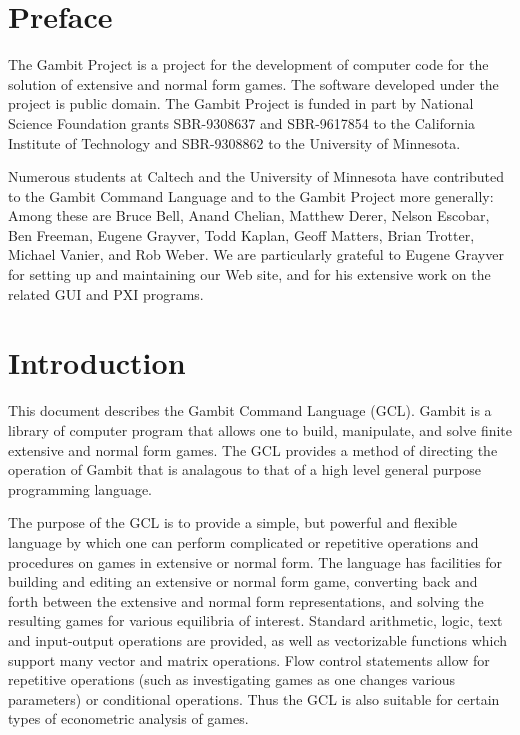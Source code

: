 \tableofcontents

\chapter*{Preface}
\pagestyle{myheadings}

The Gambit Project is a project for the development of computer code
for the solution of extensive and normal form games.  The software
developed under the project is public domain.  The Gambit Project is
funded in part by National Science Foundation grants SBR-9308637 and
SBR-9617854 to the California Institute of Technology and SBR-9308862
to the University of Minnesota.

Numerous students at Caltech and the University of Minnesota have
contributed to the Gambit Command Language and to the Gambit Project
more generally: Among these are Bruce Bell, Anand Chelian, Matthew
Derer, Nelson Escobar, Ben Freeman, Eugene Grayver, Todd Kaplan, Geoff
Matters, Brian Trotter, Michael Vanier, and Rob Weber. We are
particularly grateful to Eugene Grayver for setting up and maintaining
our Web site, and for his extensive work on the related GUI and PXI
programs.  

\chapter{Introduction}
\pagestyle{headings}

This document describes the Gambit Command Language (GCL).  Gambit is
a library of computer program that allows one to build, manipulate,
and solve finite extensive and normal form games. The GCL provides a
method of directing the operation of Gambit that is analagous to that
of a high level general purpose programming language.

The purpose of the GCL is to provide a simple, but powerful and
flexible language by which one can perform complicated or repetitive
operations and procedures on games in extensive or normal form.  The
language has facilities for building and editing an extensive or
normal form game, converting back and forth between the extensive and
normal form representations, and solving the resulting games for
various equilibria of interest.  Standard arithmetic, logic, text and
input-output operations are provided, as well as vectorizable
functions which support many vector and matrix operations.  Flow
control statements allow for repetitive operations (such as
investigating games as one changes various parameters) or conditional
operations.  Thus the GCL is also suitable for certain types of
econometric analysis of games.


